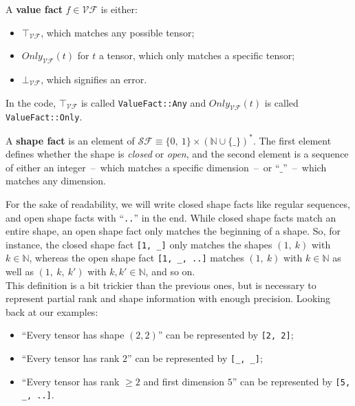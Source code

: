 \documentclass[11pt]{article}
\begin{document}
\begin{definition}
A \textbf{value fact} $f \in \mathcal{VF}$ is either:
\begin{itemize}[noitemsep]
    \item $\top_\mathcal{VF}$, which matches any possible tensor;
    \item $Only_\mathcal{VF}(t)$ for $t$ a tensor, which only matches a specific tensor;
    \item $\bot_\mathcal{VF}$, which signifies an error.
\end{itemize}

In the code, $\top_\mathcal{VF}$ is called \texttt{ValueFact::Any} and $Only_\mathcal{VF}(t)$ is called \texttt{ValueFact::Only}.\\
\end{definition}

\begin{definition}
A \textbf{shape fact} is an element of $\mathcal{SF} \equiv \{0,\ 1\} \times \left(\mathbb{N} \cup \{\_\}\right)^*$. The first element defines whether the shape is \textit{closed} or \textit{open}, and the second element is a sequence of either an integer~--~which matches a specific dimension~--~or ``$\_$''~--~which matches any dimension.

For the sake of readability, we will write closed shape facts like regular sequences, and open shape facts with ``\texttt{..}'' in the end. While closed shape facts match an entire shape, an open shape fact only matches the beginning of a shape. So, for instance, the closed shape fact \texttt{[1, \_]} only matches the shapes $(1,\ k)$ with $k \in \mathbb{N}$, whereas the open shape fact \texttt{[1, \_, ..]} matches $(1,\ k)$ with $k \in \mathbb{N}$ as well as $(1,\ k,\ k')$ with $k, k' \in \mathbb{N}$, and so on.\\

This definition is a bit trickier than the previous ones, but is necessary to represent partial rank and shape information with enough precision. Looking back at our examples:
\begin{itemize}[noitemsep]
    \item ``Every tensor has shape $(2, 2)$'' can be represented by \texttt{[2, 2]};
    \item ``Every tensor has rank $2$'' can be represented by \texttt{[\_, \_]};
    \item ``Every tensor has rank $\geq 2$ and first dimension $5$'' can be represented by \texttt{[5, \_, ..]}.\\
\end{itemize}
\end{definition}
\end{document}
